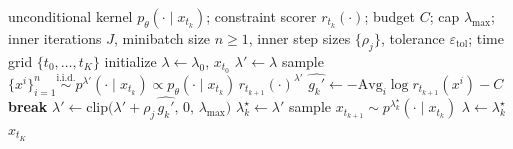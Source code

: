 \documentclass{article}
\newcommand{\eps}{\varepsilon}
\newcommand{\lstar}{\lambda^{\star}}
\begin{document}
\begin{algorithm}[t]
\caption{Adaptive Dual Guidance with exact per-step solve (first-order inner loop)}
\label{alg:inner-fo}
\begin{algorithmic}[1]
\Require unconditional kernel $p_\theta(\cdot\mid x_{t_k})$; constraint scorer $r_{t_k}(\cdot)$; budget $C$; cap $\lambda_{\max}$; inner iterations $J$, minibatch size $n\ge1$, inner step sizes $\{\rho_j\}$, tolerance $\eps_{\mathrm{tol}}$; time grid $\{t_0,\dots,t_K\}$
\State initialize $\lambda\gets\lambda_0$, $x_{t_0}$
  \State $\lambda'\gets\lambda$ 
   
    \State sample $\{x^i\}_{i=1}^n\stackrel{\text{i.i.d.}}{\sim}p^{\lambda'}(\cdot\mid x_{t_k})\propto p_\theta(\cdot\mid x_{t_k})\,r_{t_{k+1}}(\cdot)^{\lambda'}$
    \State $\widehat{g_k'}\gets-\mathrm{Avg}_i\log r_{t_{k+1}}(x^i)-C$ 
    \If{$|\widehat{g_k'}|\le\eps_{\mathrm{tol}}$} \textbf{break} \EndIf
    \State $\lambda'\gets\mathrm{clip}\big(\lambda'+\rho_j\,\widehat{g_k'},\,0,\,\lambda_{\max}\big)$ 
  \EndFor
  \State $\lstar_k\gets\lambda'$ 
  \State sample $x_{t_{k+1}}\sim p^{\lstar_k}(\cdot\mid x_{t_k})$ 
  \State $\lambda\gets\lstar_k$
\EndFor
\State \Return $x_{t_K}$
\end{algorithmic}
\end{algorithm}
\end{document}
